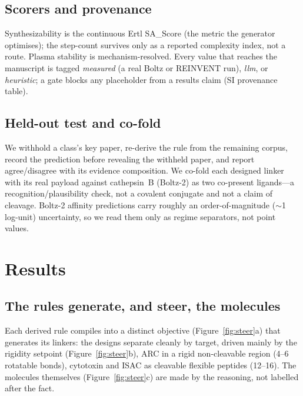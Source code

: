 \documentclass[10pt]{article}
\begin{document}
\subsection{Scorers and provenance}
Synthesizability is the continuous Ertl SA\_Score (the metric the generator optimises); the step-count survives only as a reported complexity index, not a route. Plasma stability is mechanism-resolved. Every value that reaches the manuscript is tagged \emph{measured} (a real Boltz or REINVENT run), \emph{llm}, or \emph{heuristic}; a gate blocks any placeholder from a results claim (SI provenance table).

\subsection{Held-out test and co-fold}
We withhold a class's key paper, re-derive the rule from the remaining corpus, record the prediction before revealing the withheld paper, and report agree/disagree with its evidence composition. We co-fold each designed linker with its real payload against cathepsin~B (Boltz-2) as two co-present ligands---a recognition/plausibility check, not a covalent conjugate and not a claim of cleavage. Boltz-2 affinity predictions carry roughly an order-of-magnitude ($\sim$1 log-unit) uncertainty, so we read them only as regime separators, not point values.
\section{Results}\subsection{The rules generate, and steer, the molecules}
Each derived rule compiles into a distinct objective (Figure~\ref{fig:steer}a) that generates its linkers: the designs separate cleanly by target, driven mainly by the rigidity setpoint (Figure~\ref{fig:steer}b), ARC in a rigid non-cleavable region (4--6 rotatable bonds), cytotoxin and ISAC as cleavable flexible peptides (12--16). The molecules themselves (Figure~\ref{fig:steer}c) are made by the reasoning, not labelled after the fact.
\end{document}
